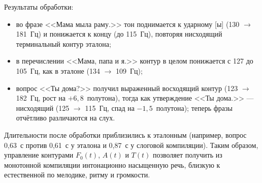 Результаты обработки:
\begin{itemize}
	\item во фразе <<Мама мыла раму.>> тон поднимается к ударному [ы]
	(130 \(\to\) 181~Гц) и понижается к концу (до 115~Гц), повторяя
	нисходящий терминальный контур эталона;
	\item в перечислении <<Мама, папа и я.>> контур в целом понижается с
	127 до 105~Гц, как в эталоне (134 \(\to\) 109~Гц);
	\item вопрос <<Ты дома?>> получил выраженный восходящий контур
	(123 \(\to\) 182~Гц, рост на $+6{,}8$~полутона), тогда как утверждение
	<<Ты дома.>> --- нисходящий (125 \(\to\) 115~Гц, спад на
	$-1{,}5$~полутона); теперь фразы отчётливо различаются на слух.
\end{itemize}
Длительности после обработки приблизились к эталонным (например, вопрос
0,63~с против 0,61~с у эталона и 0,87~с у слоговой компиляции). Таким
образом, управление контурами $F_0(t)$, $A(t)$ и $T(t)$ позволяет получить
из монотонной компиляции интонационно насыщенную речь, близкую к
естественной по мелодике, ритму и громкости.

